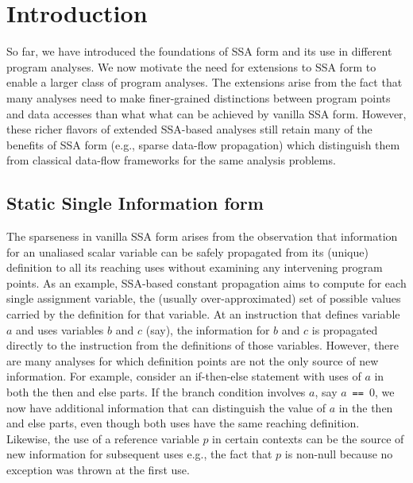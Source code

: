 \chapter{Introduction }


So far, we have introduced the foundations of SSA form and its use in different program analyses. 
We now motivate the need for extensions to SSA form to enable a larger class of program analyses. 
The extensions arise from the fact that many analyses need to make finer-grained distinctions between program points and data accesses than what what can be achieved by vanilla SSA form. 
However, these richer flavors of extended SSA-based analyses still retain many of the benefits of SSA form (e.g., sparse data-flow propagation) which distinguish them from classical data-flow frameworks for the same analysis problems.


\section{Static Single Information form}

The sparseness in vanilla SSA form arises from the observation that information for an unaliased scalar variable can be safely propagated from its (unique) definition to all its reaching uses without examining any intervening program points. 
As an example, SSA-based constant propagation aims to compute for each single assignment variable, the (usually over-approximated) set of possible values carried by the definition for that variable. 
At an instruction that defines variable $a$ and uses variables $b$ and $c$ (say), the information for $b$ and $c$ is propagated directly to the instruction from the definitions of those variables. 
However, there are many analyses for which definition points are not the only source of new information. 
For example, consider an if-then-else statement with uses of $a$ in both the then and else parts. 
If the branch condition involves $a$, say $a$~{\tt ==}~0, we now have additional information that can distinguish the value of $a$ in the then and else parts, even though both uses have the same reaching definition. 
Likewise, the use of a reference variable $p$ in certain contexts can be the source of new information for subsequent uses e.g., the fact that $p$ is non-null because no exception was thrown at the first use.


